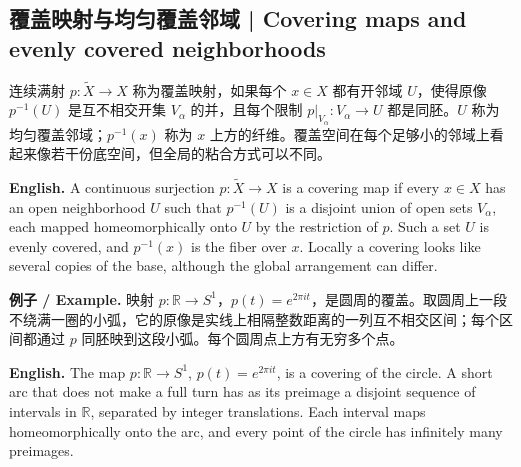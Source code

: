 \documentclass[UTF8,11pt,a4paper]{ctexart}
\newcommand{\EN}[1]{\par\noindent\textbf{English.} #1\par}
\newcommand{\EX}[2]{\par\noindent\textbf{例子 / Example.} #1\par\EN{#2}}
\begin{document}
\subsection{覆盖映射与均匀覆盖邻域 | Covering maps and evenly covered neighborhoods}
\noindent 连续满射 $p:\widetilde X\to X$ 称为覆盖映射，如果每个 $x\in X$ 都有开邻域 $U$，使得原像 $p^{-1}(U)$ 是互不相交开集 $V_\alpha$ 的并，且每个限制 $p|_{V_\alpha}:V_\alpha\to U$ 都是同胚。$U$ 称为均匀覆盖邻域；$p^{-1}(x)$ 称为 $x$ 上方的纤维。覆盖空间在每个足够小的邻域上看起来像若干份底空间，但全局的粘合方式可以不同。
\EN{A continuous surjection $p:\widetilde X\to X$ is a covering map if every $x\in X$ has an open neighborhood $U$ such that $p^{-1}(U)$ is a disjoint union of open sets $V_\alpha$, each mapped homeomorphically onto $U$ by the restriction of $p$. Such a set $U$ is evenly covered, and $p^{-1}(x)$ is the fiber over $x$. Locally a covering looks like several copies of the base, although the global arrangement can differ.}
\EX{映射 $p:\mathbb R\to S^1$，$p(t)=e^{2\pi i t}$，是圆周的覆盖。取圆周上一段不绕满一圈的小弧，它的原像是实线上相隔整数距离的一列互不相交区间；每个区间都通过 $p$ 同胚映到这段小弧。每个圆周点上方有无穷多个点。}{The map $p:\mathbb R\to S^1$, $p(t)=e^{2\pi i t}$, is a covering of the circle. A short arc that does not make a full turn has as its preimage a disjoint sequence of intervals in $\mathbb R$, separated by integer translations. Each interval maps homeomorphically onto the arc, and every point of the circle has infinitely many preimages.}
\end{document}
